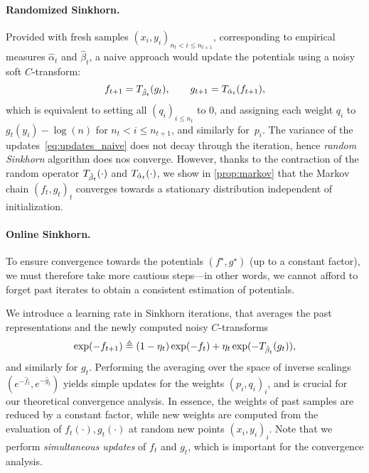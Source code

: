 \paragraph{Randomized Sinkhorn.}
Provided with fresh samples $(x_i, y_i)_{n_t < i \leq n_{t+1}}$, 
corresponding to empirical measures $\hat \alpha_t$ and $\hat \beta_t$, a naive approach would 
 update the potentials using a noisy soft $C$-transform:
\begin{equation}\label{eq:updates_naive}
     f_{t+1} = \Ctrans{g_t}{\hat \beta_t},
    \qquad g_{t+1} = \Ctrans{f_{t+1}}{\hat \alpha_t},
\end{equation}
which is equivalent to setting all $(q_i)_{i \leq n_t}$ to $0$, and assigning each weight
 $q_i$ to $g_t(y_i) - \log(n)$ for $n_t < i \leq  n_{t+1}$, and similarly for~$p_i$.
%
The variance of the updates~\eqref{eq:updates_naive} does not decay through the
iteration, hence \textit{random Sinkhorn} algorithm does nos converge.
However, thanks to the contraction of the random operator $\Ctrans{\cdot}{\hat
\beta_t}$ and $\Ctrans{\cdot}{\hat \alpha_t}$, we show in \autoref{prop:markov} that
the Markov chain ${(f_t, g_t)}_t$ converges towards a
stationary distribution independent of initialization.

\paragraph{Online Sinkhorn.}

To ensure convergence towards the potentials $(f^\star, g^\star)$ (up to a
constant factor), we must therefore take more cautious steps---in other words,
we cannot afford to forget past iterates to obtain a consistent estimation of
potentials. 




We introduce a learning rate in Sinkhorn iterations, that averages
the past representations and the newly computed noisy $C$-transforms
\begin{equation}\label{eq:updates}
    \exp(-f_{t+1})
    \eqdef (1 - \eta_t) \exp(-f_t) 
    + \eta_t 
    \exp(-\Ctrans{g_t}{\hat \beta_t}),
\end{equation}
and similarly for $g_t$. Performing the averaging over the space of inverse
scalings $(e^{-\hat f_{t}},e^{-\hat g_{t}})$ yields simple updates for the
weights ${(p_i,q_i)}_i$, and is crucial for our theoretical convergence
analysis. In essence, the weights of past samples are reduced by a constant
factor, while new weights are computed from the evaluation of $f_t(\cdot),
g_t(\cdot)$ at random new points ${(x_i, y_i)}_i$. Note that we perform
\textit{simultaneous updates} of $f_t$ and $g_t$, which is important for the
convergence analysis.

